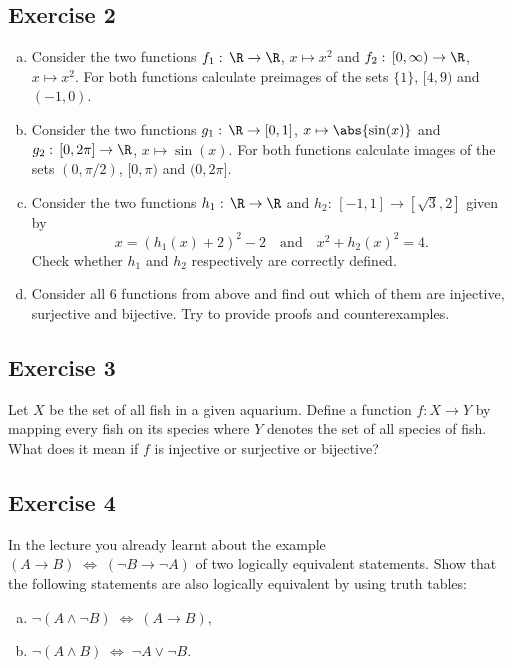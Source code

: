 \subsection*{Exercise 2}
\begin{enumerate}[(a)]
	\item
	Consider the two functions $f_1:\, \R \to \R$, $x \mapsto x^2$ and $f_2:\, [0, \infty) \to \R$, $x \mapsto x^2$. 
	For both functions calculate preimages of the sets $\{1\}$, $[4,9)$ and $(-1,0)$. 
	
	\item
	Consider the two functions $g_1:\, \R \to [0,1]$, $x \mapsto \abs{\sin (x)}$ and $g_2:\, [0, 2\pi] \to \R$, $x \mapsto \sin (x)$. 
	For both functions calculate images of the sets $(0, \pi/2)$, $[0,\pi)$ and $(0,2\pi]$.
	
	\item
	Consider the two functions $h_1:\, \R \to \R$ and $h_2:\, [-1, 1] \to [\sqrt{3},2]$ given by
	\[
	x = \left(h_1(x)+2\right)^2-2 \quad \text{and} \quad x^2 + h_2(x)^2 = 4. 
	\] 
	Check whether $h_1$ and $h_2$ respectively are correctly defined. 
	
	\item
	Consider all 6 functions from above and find out which of them are injective, surjective and bijective. 
	Try to provide proofs and counterexamples. 
\end{enumerate}

\subsection*{Exercise 3}
Let $X$ be the set of all fish in a given aquarium. 
Define a function $f:X \to Y$ by mapping every fish on its species where $Y$ denotes the set of all species of fish. 
What does it mean if $f$ is injective or surjective or bijective? 

\subsection*{Exercise 4}
In the lecture you already learnt about the example $(A \rightarrow B) \; \Leftrightarrow \; (\neg B \rightarrow \neg A)$ of two logically equivalent statements. 
Show that the following statements are also logically equivalent by using truth tables:
\begin{enumerate}[(a)]
	\item
	$\neg (A \wedge \neg B) \; \Leftrightarrow \: (A \rightarrow B),$
	\item
	$\neg (A \wedge B) \; \Leftrightarrow \; \neg A \vee \neg B.$
\end{enumerate}


